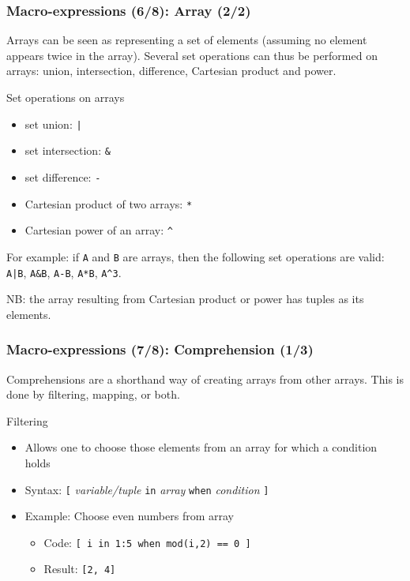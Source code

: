 \documentclass[aspectratio=169]{beamer}
\begin{document}
\begin{frame}[fragile=singleslide]
  \frametitle{Macro-expressions (6/8): Array (2/2)}
  Arrays can be seen as representing a set of elements (assuming no element
  appears twice in the array). Several set operations can thus be performed on
  arrays: union, intersection, difference, Cartesian product and power.
  \begin{block}{Set operations on arrays}
    \begin{itemize}
    \item set union: \texttt{|}
    \item set intersection: \texttt{\&}
    \item set difference: \texttt{-}
    \item Cartesian product of two arrays: \texttt{*}
    \item Cartesian power of an array: \texttt{\^}
    \end{itemize}
  \end{block}
  For example: if \texttt{A} and \texttt{B} are arrays, then the following
  set operations are valid: \texttt{A|B}, \texttt{A\&B}, \texttt{A-B},
  \texttt{A*B}, \texttt{A\^{}3}.

  NB: the array resulting from Cartesian product or power has tuples as its elements.
\end{frame}

\begin{frame}[fragile=singleslide]
  \frametitle{Macro-expressions (7/8): Comprehension (1/3)}
  Comprehensions are a shorthand way of creating arrays from other arrays. This is done by filtering, mapping, or both.
  \begin{block}{Filtering}
    \begin{itemize}
    \item Allows one to choose those elements from an array for which a condition holds
    \item Syntax: \texttt{[} \textit{variable/tuple} \texttt{in} \textit{array} \texttt{when}
      \textit{condition} \texttt{]}
    \item Example: Choose even numbers from array
      \begin{itemize}
      \item Code: \texttt{[ i in 1:5 when mod(i,2) == 0 ]}
      \item Result: \texttt{[2, 4]}
      \end{itemize}
    \end{itemize}
  \end{block}
\end{frame}
\end{document}
